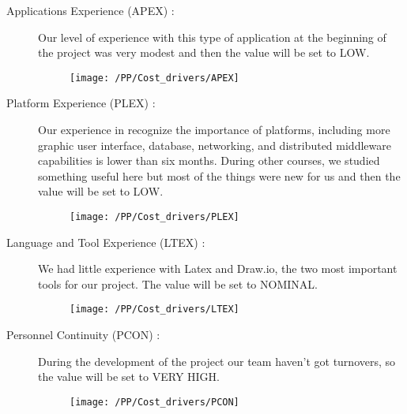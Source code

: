 \begin{description}
    \newpage
    \item [Applications Experience (APEX) :]  Our level of experience with this type of application at the beginning of the project was very modest and then the value will be set to LOW.
    \begin{figure}[!ht]
      \centering
      \vspace{0.2cm}
      \texttt{[image: /PP/Cost\_drivers/APEX]}\\
      \vspace{0.2cm}
      \label{fig:APEX} 
    \end{figure}   
    \item [Platform Experience (PLEX) :] Our experience in recognize the importance of platforms, including more graphic user interface, database, networking, and distributed middleware capabilities is lower than six months. During other courses, we studied something useful here but most of the things were new for us and then the value will be set to LOW.
    \begin{figure}[!ht]
      \centering
      \vspace{0.2cm}
      \texttt{[image: /PP/Cost\_drivers/PLEX]}\\
      \vspace{0.2cm}
      \label{fig:PLEX} 
    \end{figure}  
    \item [Language and Tool Experience (LTEX) :] We had little experience with Latex and Draw.io, the two most important tools for our project. The value will be set to NOMINAL. 
    \begin{figure}[!ht]
      \centering
      \vspace{0.2cm}
      \texttt{[image: /PP/Cost\_drivers/LTEX]}\\
      \vspace{0.2cm}
      \label{fig:LTEX} 
    \end{figure}  
    \item [Personnel Continuity (PCON) :] During the development of the project our team haven't got turnovers, so the value will be set to VERY HIGH.
    \begin{figure}[!ht]
      \centering
      \vspace{0.2cm}
      \texttt{[image: /PP/Cost\_drivers/PCON]}\\
      \vspace{0.2cm}
      \label{fig:PCON} 
    \end{figure}  
\end{description}

